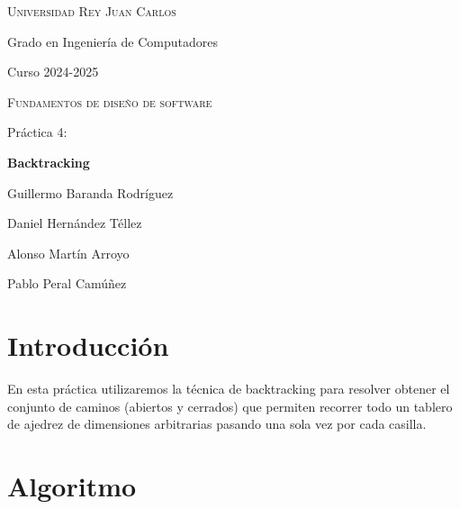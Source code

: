 \documentclass[12pt, a4paper]{article}
\begin{document}
\begin{titlepage}
    \centering

    {\LARGE \textsc{Universidad Rey Juan Carlos} \par}

    {\Large Grado en Ingeniería de Computadores \par}

    {\large Curso 2024-2025 \par}

    \vspace{8cm}

    {\Large \textsc{Fundamentos de diseño de software} \par}

    \vspace{0.5cm}

    {\huge Práctica 4: \par}

    {\Huge \bfseries Backtracking \par}

    \vfill

    {\LARGE Guillermo Baranda Rodríguez \par}
    {\LARGE Daniel Hernández Téllez \par}
    {\LARGE Alonso Martín Arroyo \par}
    {\LARGE Pablo Peral Camúñez \par}
\end{titlepage}

\section{Introducción}

En esta práctica utilizaremos la técnica de backtracking para
resolver obtener el conjunto de caminos (abiertos y cerrados) que
permiten recorrer todo un tablero de ajedrez de dimensiones
arbitrarias pasando una sola vez por cada casilla.

\section{Algoritmo}
\end{document}
